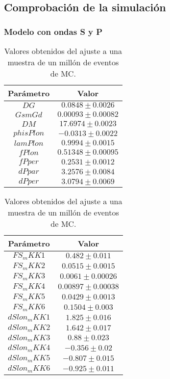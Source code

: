 
\subsection{Comprobación de la simulación}



\subsubsection{Modelo con ondas S y P}

\begin{table}[H]
\centering
\begin{multicols}{2}
\begin{tabular}{cc}
\toprule
Parámetro & Valor \\ \midrule
$ DG          $&$ 0.0848 \pm 0.0026 $ \\
$ GsmGd       $&$0.00093 \pm 0.00082$ \\
$ DM          $&$ 17.6974 \pm 0.0023$ \\
$ phisPlon    $&$ -0.0313 \pm 0.0022$ \\
$ lamPlon     $&$ 0.9994 \pm 0.0015 $ \\
$ fPlon       $&$0.51348 \pm 0.00095$ \\
$ fPper       $&$ 0.2531 \pm 0.0012 $ \\
$ dPpar       $&$ 3.2576 \pm 0.0084 $ \\
$ dPper       $&$ 3.0794 \pm 0.0069 $ \\
\bottomrule
\end{tabular}
\begin{tabular}{cc}
\toprule
Parámetro & Valor \\ \midrule
$ FS_mKK1     $&$  0.482 \pm 0.011  $ \\
$ FS_mKK2     $&$ 0.0515 \pm 0.0015 $ \\
$ FS_mKK3     $&$ 0.0061 \pm 0.00026$ \\
$ FS_mKK4     $&$0.00897 \pm 0.00038$ \\
$ FS_mKK5     $&$ 0.0429 \pm 0.0013 $ \\
$ FS_mKK6     $&$  0.1504 \pm 0.003 $ \\
$ dSlon_mKK1  $&$  1.825 \pm 0.016  $ \\
$ dSlon_mKK2  $&$  1.642 \pm 0.017  $ \\
$ dSlon_mKK3  $&$   0.88 \pm 0.023  $ \\
$ dSlon_mKK4  $&$  -0.356 \pm 0.02  $ \\
$ dSlon_mKK5  $&$  -0.807 \pm 0.015 $ \\
$ dSlon_mKK6  $&$  -0.925 \pm 0.011 $ \\
\bottomrule
\end{tabular}
\end{multicols}
  \caption{Valores obtenidos del ajuste a una muestra de un millón de eventos  de MC.}
\end{table}

